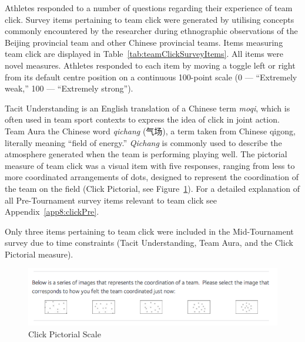 \begin{CJK}{UTF8}{gbsn}

Athletes responded to a number of questions regarding their experience of team click. Survey items pertaining to team click were generated by utilising concepts commonly encountered by the researcher during ethnographic observations of the Beijing provincial team and other Chinese provincial teams. Items measuring team click are displayed in Table~\ref{tab:teamClickSurveyItems}.  All items were novel measures. Athletes responded to each item by moving a toggle left or right from its default centre position on a continuous 100-point scale (0 --- ``Extremely weak,'' 100 --- ``Extremely strong'').

Tacit Understanding is an English translation of a Chinese term \textit{moqi}, which is often used in team sport contexts to express the idea of click in joint action.  Team Aura the Chinese word \textit{qichang} (气场), a term taken from Chinese qigong, literally meaning ``field of energy.'' \textit{Qichang} is commonly used to describe the atmosphere generated when the team is performing playing well.  The pictorial measure of team click was a visual item with five responses, ranging from less to more coordinated arrangements of dots, designed to represent the coordination of the team on the field (Click Pictorial, see Figure~\ref{fig:clickPictorial}).  For a detailed explanation of all Pre-Tournament survey items relevant to team click see Appendix~\ref{app8:clickPre}.

Only three items pertaining to team click were included in the Mid-Tournament survey due to time constraints (Tacit Understanding, Team Aura, and the Click Pictorial measure).




  \begin{figure}[htbp]
    \includegraphics[width = \linewidth]{images/teamClickPictorial.png}
    \caption{Click Pictorial Scale}
    \label{fig:clickPictorial}
  \end{figure}



\end{CJK}
